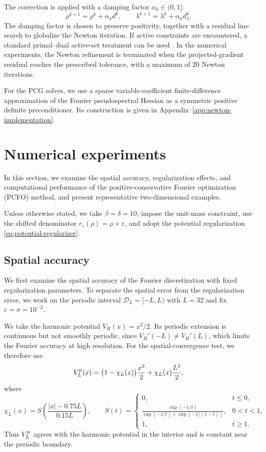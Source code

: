 \documentclass[11pt]{article}
\newcommand{\eps}{\varepsilon}
\newcommand{\sig}{\sigma}
\theoremstyle{plain}
\theoremstyle{definition}
\numberwithin{equation}{section}
\begin{document}
The correction is applied with a damping factor
$\alpha_k\in(0,1]$:
\[
\rho^{k+1}
=
\rho^k+\alpha_kd^k,
\qquad
\lambda^{k+1}
=
\lambda^k+\alpha_kd_\lambda^k.
\]
The damping factor is chosen to preserve positivity, together with a
residual line search to globalize the Newton iteration.
If active constraints are
encountered, a standard primal--dual active-set treatment can be used 
\cite{Ulbrich2011}. 
In the numerical experiments, the Newton refinement is terminated when the projected-gradient residual reaches the prescribed tolerance, with a maximum of 20 Newton iterations.

For the PCG solves, we use a sparse variable-coefficient
finite-difference approximation of the Fourier pseudospectral
Hessian as a symmetric positive definite preconditioner. Its
construction is given in
Appendix~\ref{app:newton-implementation}.


\section{Numerical experiments}
\label{sec:num}

In this section, we examine the spatial accuracy, regularization
effects, and computational performance of the positive-conservative
Fourier optimization (PCFO) method, and present representative
two-dimensional examples.

Unless otherwise stated, we take $\beta=\delta=10$, impose the
unit-mass constraint, use the shifted denominator
$r_\eps(\rho)=\rho+\eps$, and adopt the potential regularization
\eqref{eq:potential-regularizer}.
\subsection{Spatial accuracy}
\label{subsec:num-mesh}

We first examine the spatial accuracy of the Fourier discretization
with fixed regularization parameters. 
To separate the spatial error from
the regularization error, we work on the periodic interval
$\mathcal D_L=[-L,L)$ with $L=32$ and fix
$\eps=\sig=10^{-2}$. 

We take the harmonic potential $V_H(x)=x^2/2$. Its periodic extension
is continuous but not smoothly periodic, since
$V_H'(-L)\ne V_H'(L)$, which limits the Fourier accuracy at high
resolution. For the spatial-convergence test, we therefore use
\begin{equation}
\label{eq:periodic-harmonic}
V_L^{\rm p}(x)
=
\bigl(1-\chi_L(x)\bigr)\frac{x^2}{2}
+
\chi_L(x)\frac{L^2}{2},
\end{equation}
where
\[
\chi_L(x)
=
S\left(\frac{|x|-0.75L}{0.15L}\right),
\qquad
S(t)
=
\begin{cases}
0, & t\le0,\\
\displaystyle
\frac{\exp(-1/t)}{\exp(-1/t)+\exp(-1/(1-t))},
& 0<t<1,\\
1, & t\ge1.
\end{cases}
\]
Thus $V_L^{\rm p}$ agrees with the harmonic potential in the
interior and is constant near the periodic boundary.
\end{document}
